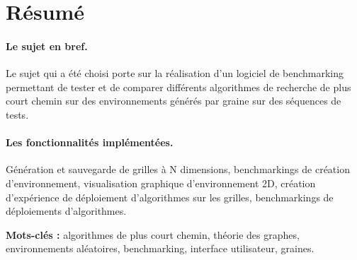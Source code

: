\documentclass[pidr]{tnreport}
\begin{document}
\section*{Résumé}

\paragraph{Le sujet en bref.}
Le sujet qui a été choisi porte sur la réalisation d'un logiciel de benchmarking permettant de tester et de comparer différents algorithmes de recherche de plus court chemin sur des environnements générés par graine sur des séquences de tests. \linebreak

\paragraph{Les fonctionnalités implémentées.}

Génération et sauvegarde de grilles à N dimensions, benchmarkings de création d'environnement, visualisation graphique d'environnement 2D, création d'expérience de déploiement d'algorithmes sur les grilles, benchmarkings de déploiements d'algorithmes.

{\bf Mots-clés :} algorithmes de plus court chemin, théorie des graphes, environnements aléatoires, benchmarking, interface utilisateur, graines.
\end{document}
